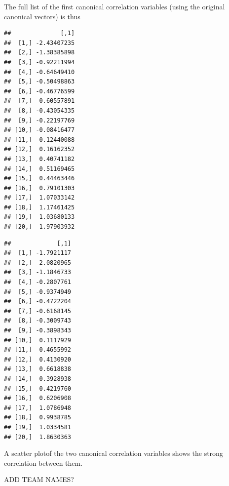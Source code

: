 \documentclass[]{book}
\newenvironment{Shaded}{\begin{snugshade}}{\end{snugshade}}
\newcommand{\CommentTok}[1]{\textcolor[rgb]{0.56,0.35,0.01}{\textit{#1}}}
\newcommand{\DataTypeTok}[1]{\textcolor[rgb]{0.13,0.29,0.53}{#1}}
\newcommand{\DecValTok}[1]{\textcolor[rgb]{0.00,0.00,0.81}{#1}}
\newcommand{\KeywordTok}[1]{\textcolor[rgb]{0.13,0.29,0.53}{\textbf{#1}}}
\newcommand{\NormalTok}[1]{#1}
\newcommand{\OperatorTok}[1]{\textcolor[rgb]{0.81,0.36,0.00}{\textbf{#1}}}
\newcommand{\StringTok}[1]{\textcolor[rgb]{0.31,0.60,0.02}{#1}}
\theoremstyle{definition}
\theoremstyle{definition}
\theoremstyle{definition}
\theoremstyle{remark}
\begin{document}
The full list of the first canonical correlation variables (using the original canonical vectors) is thus

\begin{Shaded}
\end{Shaded}

\begin{verbatim}
##              [,1]
##  [1,] -2.43407235
##  [2,] -1.38385898
##  [3,] -0.92211994
##  [4,] -0.64649410
##  [5,] -0.50498863
##  [6,] -0.46776599
##  [7,] -0.60557891
##  [8,] -0.43054335
##  [9,] -0.22197769
## [10,] -0.08416477
## [11,]  0.12440088
## [12,]  0.16162352
## [13,]  0.40741182
## [14,]  0.51169465
## [15,]  0.44463446
## [16,]  0.79101303
## [17,]  1.07033142
## [18,]  1.17461425
## [19,]  1.03680133
## [20,]  1.97903932
\end{verbatim}

\begin{Shaded}
\end{Shaded}

\begin{verbatim}
##             [,1]
##  [1,] -1.7921117
##  [2,] -2.0820965
##  [3,] -1.1846733
##  [4,] -0.2807761
##  [5,] -0.9374949
##  [6,] -0.4722204
##  [7,] -0.6168145
##  [8,] -0.3009743
##  [9,] -0.3898343
## [10,]  0.1117929
## [11,]  0.4655992
## [12,]  0.4130920
## [13,]  0.6618838
## [14,]  0.3928938
## [15,]  0.4219760
## [16,]  0.6206908
## [17,]  1.0786948
## [18,]  0.9938785
## [19,]  1.0334581
## [20,]  1.8630363
\end{verbatim}

A scatter plotof the two canonical correlation variables shows the strong correlation between them.

ADD TEAM NAMES?
\end{document}
